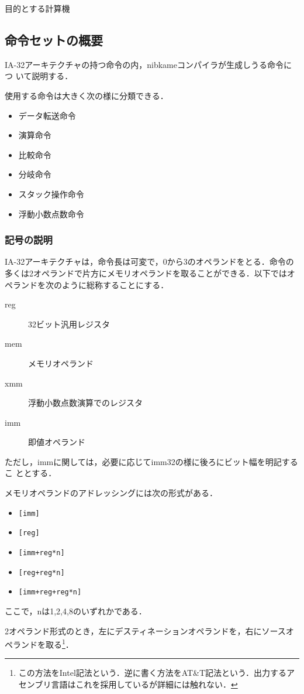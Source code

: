 \documentclass[a4paper,titlepage,report,disablejfam]{jsbook}
\begin{document}
\begin{resbonsiblesection}{目的とする計算機}{\kobori}
\subsection{命令セットの概要}
IA-32アーキテクチャの持つ命令の内，nibkameコンパイラが生成しうる命令につ
いて説明する．

使用する命令は大きく次の様に分類できる．
\begin{itemize}
 \item データ転送命令
 \item 演算命令
 \item 比較命令
 \item 分岐命令
 \item スタック操作命令
 \item 浮動小数点数命令
\end{itemize}

\subsubsection{記号の説明}
IA-32アーキテクチャは，命令長は可変で，0から3のオペランドをとる．命令の
多くは2オペランドで片方にメモリオペランドを取ることができる．以下ではオ
ペランドを次のように総称することにする．
\begin{description}
 \item[reg] 32ビット汎用レジスタ
 \item[mem] メモリオペランド
 \item[xmm] 浮動小数点数演算でのレジスタ
 \item[imm] 即値オペランド
\end{description}
ただし，immに関しては，必要に応じてimm32の様に後ろにビット幅を明記するこ
ととする．

メモリオペランドのアドレッシングには次の形式がある．
\begin{itemize}
 \item \lstinline|[imm]|
 \item \lstinline|[reg]|
 \item \lstinline|[imm+reg*n]|
 \item \lstinline|[reg+reg*n]|
 \item \lstinline|[imm+reg+reg*n]|
\end{itemize}
ここで，nは1,2,4,8のいずれかである．

2オペランド形式のとき，左にデスティネーションオペランドを，右にソースオ
ペランドを取る\footnote{この方法をIntel記法という．逆に書く方法をAT\&T記法という．出力するアセンブリ言語はこれを採用しているが詳細には触れない．}．


\end{resbonsiblesection}
\end{document}
